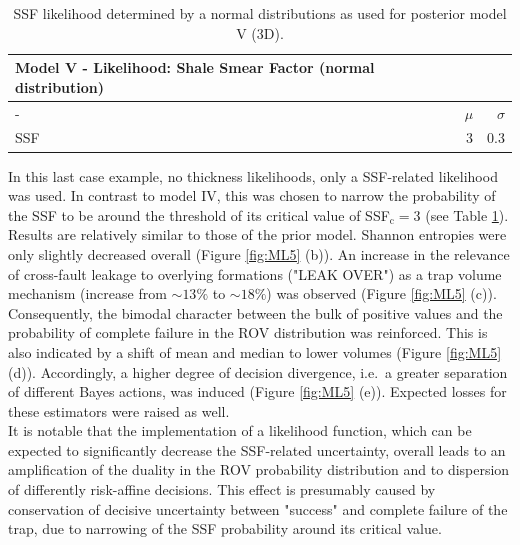 		\begin{table}[h]
			\centering
			\begin{tabular}{lrr} 
				\toprule
				Model V - Likelihood: Shale Smear Factor (normal distribution)\\
				\midrule
				- & $\mu$ & $\sigma$\\
				\midrule
				SSF & 3 & 0.3\\
				\bottomrule
			\end{tabular}
			\caption{SSF likelihood determined by a normal distributions as used for posterior model V (3D).}
			\label{tab:ML5_likelihoods}
		\end{table}
		In this last case example, no thickness likelihoods, only a SSF-related likelihood was used. In contrast to model IV, this was chosen to narrow the probability of the SSF to be around the threshold of its critical value of SSF$_\text{c} = 3$ (see Table \ref{tab:ML5_likelihoods}).\\
		Results are relatively similar to those of the prior model. Shannon entropies were only slightly decreased overall (Figure \ref{fig:ML5} (b)). An increase in the relevance of cross-fault leakage to overlying formations ("LEAK OVER") as a trap volume mechanism (increase from $\sim13\%$ to $\sim18\%$) was observed (Figure \ref{fig:ML5} (c)). Consequently, the bimodal character between the bulk of positive values and the probability of complete failure in the ROV distribution was reinforced. This is also indicated by a shift of mean and median to lower volumes (Figure \ref{fig:ML5} (d)). Accordingly, a higher degree of decision divergence, i.e.\ a greater separation of different Bayes actions, was induced (Figure \ref{fig:ML5} (e)). Expected losses for these estimators were raised as well.\\
		It is notable that the implementation of a likelihood function, which can be expected to significantly decrease the SSF-related uncertainty, overall leads to an amplification of the duality in the ROV probability distribution and to dispersion of differently risk-affine decisions. This effect is presumably caused by conservation of decisive uncertainty between "success" and complete failure of the trap, due to narrowing of the SSF probability around its critical value. 